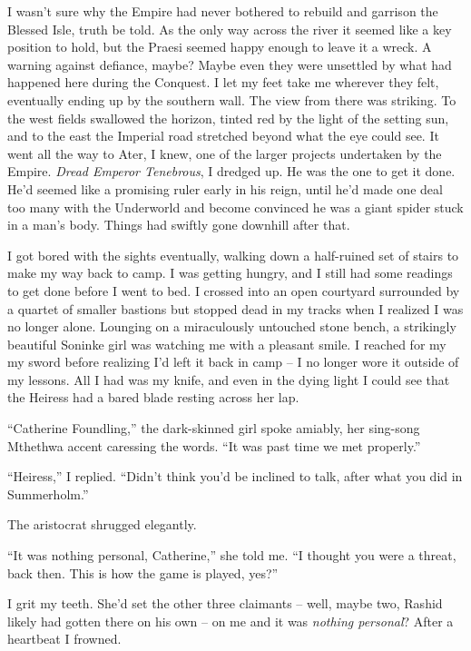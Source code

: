 \documentclass[12pt, openany]{book}
\begin{document}
I wasn’t sure why the Empire had never bothered to rebuild and garrison the Blessed Isle, truth be told. As the only way across the river it seemed like a key position to hold, but the Praesi seemed happy enough to leave it a wreck. A warning against defiance, maybe? Maybe even they were unsettled by what had happened here during the Conquest. I let my feet take me wherever they felt, eventually ending up by the southern wall. The view from there was striking. To the west fields swallowed the horizon, tinted red by the light of the setting sun, and to the east the Imperial road stretched beyond what the eye could see. It went all the way to Ater, I knew, one of the larger projects undertaken by the Empire. \textit{Dread Emperor Tenebrous}, I dredged up. He was the one to get it done. He’d seemed like a promising ruler early in his reign, until he’d made one deal too many with the Underworld and become convinced he was a giant spider stuck in a man’s body. Things had swiftly gone downhill after that.

I got bored with the sights eventually, walking down a half-ruined set of stairs to make my way back to camp. I was getting hungry, and I still had some readings to get done before I went to bed. I crossed into an open courtyard surrounded by a quartet of smaller bastions but stopped dead in my tracks when I realized I was no longer alone. Lounging on a miraculously untouched stone bench, a strikingly beautiful Soninke girl was watching me with a pleasant smile. I reached for my my sword before realizing I’d left it back in camp – I no longer wore it outside of my lessons. All I had was my knife, and even in the dying light I could see that the Heiress had a bared blade resting across her lap.

“Catherine Foundling,” the dark-skinned girl spoke amiably, her sing-song Mthethwa accent caressing the words. “It was past time we met properly.”

“Heiress,” I replied. “Didn’t think you’d be inclined to talk, after what you did in Summerholm.”

The aristocrat shrugged elegantly.

“It was nothing personal, Catherine,” she told me. “I thought you were a threat, back then. This is how the game is played, yes?”

I grit my teeth. She’d set the other three claimants – well, maybe two, Rashid likely had gotten there on his own – on me and it was \textit{nothing personal}? After a heartbeat I frowned.
\end{document}
